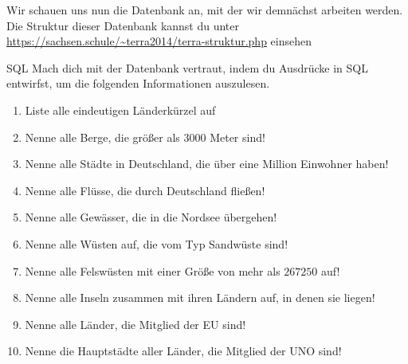 \documentclass[12pt,a4paper,notitlepage,leqno]{article}
\begin{document}
\vspace{0.2cm}

Wir schauen uns nun die Datenbank an, mit der wir demnächst arbeiten werden. Die Struktur dieser Datenbank kannst du unter \\\url{https://sachsen.schule/~terra2014/terra-struktur.php} einsehen

\begin{paufgabe}{SQL}
    Mach dich mit der Datenbank vertraut, indem du Ausdrücke in SQL entwirfst, um die folgenden Informationen auszulesen.
    \begin{enumerate}
        \item Liste alle eindeutigen Länderkürzel auf
        \item Nenne alle Berge, die größer als 3000 Meter sind!
        \item Nenne alle Städte in Deutschland, die über eine Million Einwohner haben!
        \item Nenne alle Flüsse, die durch Deutschland fließen!
        \item Nenne alle Gewässer, die in die Nordsee übergehen!
        \item Nenne alle Wüsten auf, die vom Typ Sandwüste sind!
        \item Nenne alle Felswüsten mit einer Größe von mehr als $267250$ auf!
        \item Nenne alle Inseln zusammen mit ihren Ländern auf, in denen sie liegen!
        \item Nenne alle Länder, die Mitglied der EU sind!
        \item Nenne die Hauptstädte aller Länder, die Mitglied der UNO sind!
        \end{enumerate}
\end{paufgabe}
\end{document}
